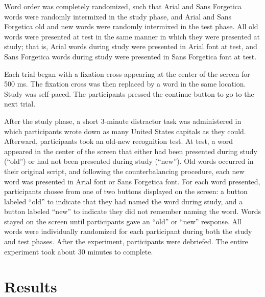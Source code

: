 \documentclass[english,pdf]{apa6}
\begin{document}
Word order was completely randomized, such that Arial and Sans Forgetica
words were randomly intermixed in the study phase, and Arial and
Sans Forgetica old and new words were randomly intermixed in the test phase.
All old words were presented at test in the same manner in which they
were presented at study; that is, Arial words during study were presented in Arial font at test, and Sans Forgetica words during study were presented in Sans Forgetica font at test.

Each trial began with a fixation cross appearing at the center of the screen for 500 ms. The fixation cross was then replaced by a word in the same location. Study was self-paced. The participants pressed the continue button to go to the next trial.

After the study phase, a short 3-minute distractor task was administered in which participants wrote down as many
United States capitals as they could. Afterward, participants took an old-new recognition test. At test, a word appeared in the center of the screen that either had been presented during study (\enquote{old}) or had not been presented during study (\enquote{new}). Old words occurred in their original script, and following the counterbalancing procedure, each new word was presented
in Arial font or Sans Forgetica font. For each word presented, participants chosee from one of two buttons displayed on the screen: a button labeled \enquote{old} to indicate that they had named the word during study, and a button labeled \enquote{new} to indicate they did
not remember naming the word. Words stayed on the screen until participants gave an \enquote{old} or \enquote{new} response. All words were individually randomized for each participant during both the study and test phases. After the experiment, participants
were debriefed. The entire experiment took about 30 minutes
to complete.

\hypertarget{results}{%
\section{Results}\label{results}}
\end{document}
